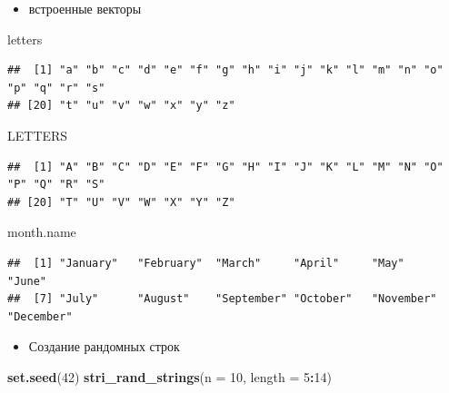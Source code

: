 \documentclass[
]{book}
\newenvironment{Shaded}{\begin{snugshade}}{\end{snugshade}}
\newcommand{\DataTypeTok}[1]{\textcolor[rgb]{0.13,0.29,0.53}{#1}}
\newcommand{\DecValTok}[1]{\textcolor[rgb]{0.00,0.00,0.81}{#1}}
\newcommand{\KeywordTok}[1]{\textcolor[rgb]{0.13,0.29,0.53}{\textbf{#1}}}
\newcommand{\NormalTok}[1]{#1}
\newcommand{\OperatorTok}[1]{\textcolor[rgb]{0.81,0.36,0.00}{\textbf{#1}}}
\providecommand{\tightlist}{%
  \setlength{\itemsep}{0pt}\setlength{\parskip}{0pt}}
\begin{document}
\begin{itemize}
\tightlist
\item
  встроенные векторы
\end{itemize}

\begin{Shaded}
\begin{Highlighting}[]
\NormalTok{letters}
\end{Highlighting}
\end{Shaded}

\begin{verbatim}
##  [1] "a" "b" "c" "d" "e" "f" "g" "h" "i" "j" "k" "l" "m" "n" "o" "p" "q" "r" "s"
## [20] "t" "u" "v" "w" "x" "y" "z"
\end{verbatim}

\begin{Shaded}
\begin{Highlighting}[]
\NormalTok{LETTERS}
\end{Highlighting}
\end{Shaded}

\begin{verbatim}
##  [1] "A" "B" "C" "D" "E" "F" "G" "H" "I" "J" "K" "L" "M" "N" "O" "P" "Q" "R" "S"
## [20] "T" "U" "V" "W" "X" "Y" "Z"
\end{verbatim}

\begin{Shaded}
\begin{Highlighting}[]
\NormalTok{month.name}
\end{Highlighting}
\end{Shaded}

\begin{verbatim}
##  [1] "January"   "February"  "March"     "April"     "May"       "June"     
##  [7] "July"      "August"    "September" "October"   "November"  "December"
\end{verbatim}

\begin{itemize}
\tightlist
\item
  Создание рандомных строк
\end{itemize}

\begin{Shaded}
\begin{Highlighting}[]
\KeywordTok{set.seed}\NormalTok{(}\DecValTok{42}\NormalTok{)}
\KeywordTok{stri_rand_strings}\NormalTok{(}\DataTypeTok{n =} \DecValTok{10}\NormalTok{, }\DataTypeTok{length =} \DecValTok{5}\OperatorTok{:}\DecValTok{14}\NormalTok{)}
\end{Highlighting}
\end{Shaded}
\end{document}
